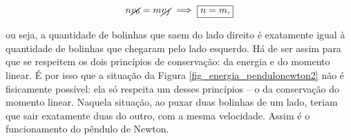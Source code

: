 \begin{exemplo}
$$ n \cancel{v_0} = m \cancel{v_f} \implies \boxed{n=m,}$$

\noindent ou seja, a quantidade de bolinhas que saem do lado direito é exatamente igual à quantidade de bolinhas que chegaram pelo lado esquerdo. Há de ser assim para que se respeitem os dois princípios de conservação: da energia e do momento linear. É por isso que a situação da Figura \ref{fig_energia_pendulonewton2} não é fisicamente possível: ela só respeita um desses princípios -- o da conservação do momento linear. Naquela situação, ao puxar duas bolinhas de um lado, teriam que sair exatamente duas do outro, com a mesma velocidade. Assim é o funcionamento do pêndulo de Newton.

\end{exemplo}


\vspace{0.3cm}





